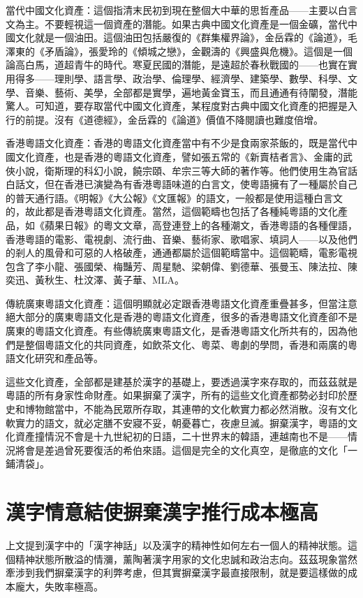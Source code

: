 \documentclass[a5paper, 12pt, openany]{book} %
\begin{document}
當代中國文化資產：這個指清末民初到現在整個大中華的思哲產品——主要以白言文為主。不要輕視這一個資產的潛能。如果古典中國文化資產是一個金礦，當代中國文化就是一個油田。這個油田包括嚴復的《群集權界論》，金岳霖的《論道》，毛澤東的《矛盾論》，張愛玲的《傾城之戀》，金觀濤的《興盛與危機》。這個是一個論高白馬，道超青牛的時代。寒夏民國的潛能，是遠超於春秋戰國的——也實在實用得多——理則學、語言學、政治學、倫理學、經濟學、建築學、數學、科學、文學、音樂、藝術、美學，全部都是實學，遍地黃金寶玉，而且通通有待闡發，潛能驚人。可知道，要存取當代中國文化資產，某程度對古典中國文化資產的把握是入行的前提。沒有《道德經》，金岳霖的《論道》價值不降閱讀也難度倍增。

香港粵語文化資產：香港的粵語文化資產當中有不少是食兩家茶飯的，既是當代中國文化資產，也是香港的粵語文化資產，譬如張五常的《新賣桔者言》、金庸的武俠小說，衛斯理的科幻小說，饒宗頤、牟宗三等大師的著作等。他們使用生為官話白話文，但在香港已演變為有香港粵語味道的白言文，使粵語擁有了一種屬於自己的普天通行語。《明報》《大公報》《文匯報》的語文，一般都是使用這種白言文的，故此都是香港粵語文化資產。當然，這個範疇也包括了各種純粵語的文化產品，如《蘋果日報》的粵文文章，高登連登上的各種潮文，香港粵語的各種俚語，香港粵語的電影、電視劇、流行曲、音樂、藝術家、歌唱家、填詞人——以及他們的剎人的風骨和可惡的人格破產，通通都屬於這個範疇當中。這個範疇，電影電視包含了李小龍、張國榮、梅豔芳、周星馳、梁朝偉、劉德華、張曼玉、陳法拉、陳奕迅、黃秋生、杜汶澤、黃子華、MLA。

傳統廣東粵語文化資產：這個明顯就必定跟香港粵語文化資產重疊甚多，但當注意絕大部分的廣東粵語文化是香港的粵語文化資產，很多的香港粵語文化資產卻不是廣東的粵語文化資產。有些傳統廣東粵語文化，是香港粵語文化所共有的，因為他們是整個粵語文化的共同資產，如飲茶文化、粵菜、粵劇的學問，香港和兩廣的粵語文化研究和產品等。

這些文化資產，全部都是建基於漢字的基礎上，要透過漢字來存取的，而茲茲就是粵語的所有身家性命財產。如果摒棄了漢字，所有的這些文化資產都勢必封印於歷史和博物館當中，不能為民眾所存取，其連帶的文化軟實力都必然消散。沒有文化軟實力的語文，就必定膳不安寢不妥，朝憂暮亡，夜慮旦滅。摒棄漢字，粵語的文化資產撞情況不會是十九世紀初的日語，二十世界末的韓語，連越南也不是——情況將會是差過曾死要復活的希伯來語。這個是完全的文化真空，是徹底的文化「一鋪清袋」。

\section{漢字情意結使摒棄漢字推行成本極高}

上文提到漢字中的「漢字神話」以及漢字的精神性如何左右一個人的精神狀態。這個精神狀態所散溢的情瀰，薰陶著漢字用家的文化忠誠和政治志向。茲茲現象當然牽涉到我們摒棄漢字的利弊考慮，但其實摒棄漢字最直接限制，就是要這樣做的成本龐大，失敗率極高。
\end{document}
